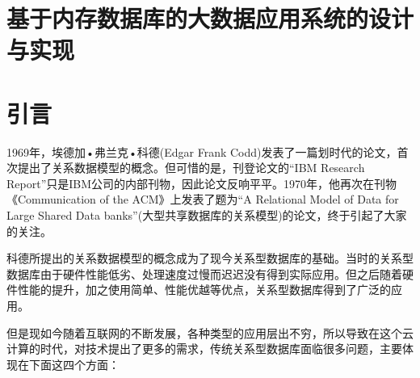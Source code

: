 \documentclass[literaturereview]{zjutreport}
\begin{document}



\frontmatter

\begingroup %
\let\clearpage\relax %

\titleformat{\chapter}[block]{\sihao\heiti\filcenter\bfseries}{\CJKnumber{\thechapter}}{1ex}{}{} %
\chapter*{基于内存数据库的大数据应用系统的设计与实现}
{} %


\mainmatter
\chapter{引言}
1969年，埃德加•弗兰克•科德(Edgar Frank Codd)发表了一篇划时代的论文，首次提出了关系数据模型的概念。但可惜的是，刊登论文的“IBM Research Report”只是IBM公司的内部刊物，因此论文反响平平。1970年，他再次在刊物《Communication of the ACM》上发表了题为“A Relational Model of Data for Large Shared Data banks”(大型共享数据库的关系模型)的论文，终于引起了大家的关注。

科德所提出的关系数据模型的概念成为了现今关系型数据库的基础。当时的关系型数据库由于硬件性能低劣、处理速度过慢而迟迟没有得到实际应用。但之后随着硬件性能的提升，加之使用简单、性能优越等优点，关系型数据库得到了广泛的应用。

但是现如今随着互联网的不断发展，各种类型的应用层出不穷，所以导致在这个云计算的时代，对技术提出了更多的需求，传统关系型数据库面临很多问题，主要体现在下面这四个方面：
\end{document}
